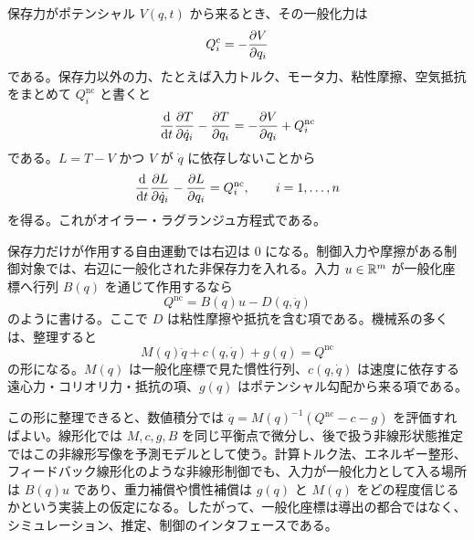 \begin{derivation}
保存力がポテンシャル $V(q,t)$ から来るとき、その一般化力は
\begin{equation}
  Q_i^\mathrm{c}=-\frac{\partial V}{\partial q_i}
\end{equation}
である。保存力以外の力、たとえば入力トルク、モータ力、粘性摩擦、空気抵抗をまとめて $Q_i^\mathrm{nc}$ と書くと
\begin{equation}
  \frac{\mathrm{d}}{\mathrm{d} t}
  \frac{\partial T}{\partial \dot{q}_i}
  -
  \frac{\partial T}{\partial q_i}
  =
  -\frac{\partial V}{\partial q_i}+Q_i^\mathrm{nc}
\end{equation}
である。$L=T-V$ かつ $V$ が $\dot{q}$ に依存しないことから
\begin{equation}
  \frac{\mathrm{d}}{\mathrm{d} t}
  \frac{\partial L}{\partial \dot{q}_i}
  -
  \frac{\partial L}{\partial q_i}
  =
  Q_i^\mathrm{nc},
  \qquad i=1,\ldots,n
\end{equation}
を得る。これがオイラー・ラグランジュ方程式である。
\end{derivation}

保存力だけが作用する自由運動では右辺は 0 になる。制御入力や摩擦がある制御対象では、右辺に一般化された非保存力を入れる。入力 $u\in\mathbb{R}^m$ が一般化座標へ行列 $B(q)$ を通じて作用するなら
\begin{equation}
  Q^\mathrm{nc}=B(q)u-D(q,\dot{q})
\end{equation}
のように書ける。ここで $D$ は粘性摩擦や抵抗を含む項である。機械系の多くは、整理すると
\begin{equation}
  M(q)\ddot{q}+c(q,\dot{q})+g(q)=Q^\mathrm{nc}
\end{equation}
の形になる。$M(q)$ は一般化座標で見た慣性行列、$c(q,\dot{q})$ は速度に依存する遠心力・コリオリ力・抵抗の項、$g(q)$ はポテンシャル勾配から来る項である。

この形に整理できると、数値積分では $\ddot{q}=M(q)^{-1}(Q^\mathrm{nc}-c-g)$ を評価すればよい。線形化では $M,c,g,B$ を同じ平衡点で微分し、後で扱う非線形状態推定ではこの非線形写像を予測モデルとして使う。計算トルク法、エネルギー整形、フィードバック線形化のような非線形制御でも、入力が一般化力として入る場所は $B(q)u$ であり、重力補償や慣性補償は $g(q)$ と $M(q)$ をどの程度信じるかという実装上の仮定になる。したがって、一般化座標は導出の都合ではなく、シミュレーション、推定、制御のインタフェースである。

